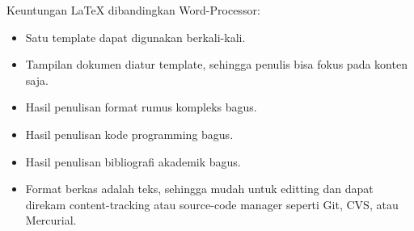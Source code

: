 \documentclass{book} %
\begin{document}
    \bigskip

    Keuntungan LaTeX dibandingkan Word-Processor:
    \begin{itemize}
        \item Satu template dapat digunakan berkali-kali.
        \item Tampilan dokumen diatur template, sehingga penulis bisa fokus pada konten saja.
        \item Hasil penulisan format rumus kompleks bagus.
        \item Hasil penulisan kode programming bagus.
        \item Hasil penulisan bibliografi akademik bagus.
        \item Format berkas adalah teks, sehingga mudah untuk editting
        dan dapat direkam content-tracking atau source-code manager seperti Git, CVS, atau Mercurial.
    \end{itemize}
\end{document}
